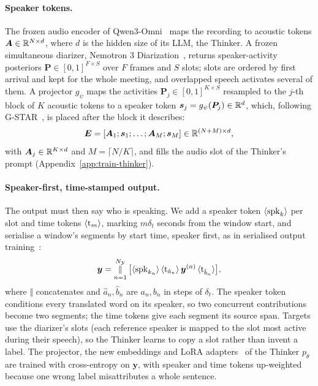 \paragraph{Speaker tokens.} The frozen audio encoder of Qwen3-Omni~\citep{xu2025qwen3omni} maps the recording to
acoustic tokens $\bm{A}\in\mathbb{R}^{N\times d}$, where $d$ is the hidden size of its LLM, the Thinker. A frozen simultaneous
diarizer, Nemotron 3 Diarization~\citep{medennikov2026nemotron}, returns speaker-activity posteriors
$\bm{P}\in[0,1]^{F\times S}$ over $F$ frames and $S$ slots; slots are ordered by first arrival and kept for the whole
meeting, and overlapped speech activates several of them. A projector $g_\psi$ maps the activities
$\bm{P}_j\in[0,1]^{K\times S}$ resampled to the $j$-th block of $K$ acoustic tokens to a speaker token
$\bm{s}_j=g_\psi(\bm{P}_j)\in\mathbb{R}^{d}$, which, following G-STAR~\citep{peng2026gstar}, is placed after the block it describes:
\begin{equation}
\bm{E}=[\bm{A}_1;\bm{s}_1;\dots;\bm{A}_M;\bm{s}_M]\in\mathbb{R}^{(N+M)\times d},
\label{eq:interleave}
\end{equation}
with $\bm{A}_j\in\mathbb{R}^{K\times d}$ and $M=\lceil N/K\rceil$, and fills the audio slot of the Thinker's prompt
(Appendix~\ref{app:train-thinker}).

\paragraph{Speaker-first, time-stamped output.} The output must then say who is speaking. We add a speaker token
$\langle\mathrm{spk}_{k}\rangle$ per slot and time tokens $\langle\mathrm{t}_{m}\rangle$, marking $m\delta_t$ seconds from the window start, and serialise a
window's segments by start time, speaker first, as in serialised output training~\citep{kanda2020sot}:
\begin{equation}
\bm{y}=\mathop{\Vert}_{n=1}^{N_\mathcal{Y}}\big[\langle\mathrm{spk}_{k_n}\rangle\,\langle\mathrm{t}_{\hat a_n}\rangle\,\bm{y}^{(n)}\,\langle\mathrm{t}_{\hat b_n}\rangle\big],
\label{eq:serial}
\end{equation}
where $\Vert$ concatenates and $\hat a_n,\hat b_n$ are $a_n,b_n$ in steps of $\delta_t$. The speaker token conditions
every translated word on its speaker, so two concurrent contributions become two segments; the time tokens give each
segment its source span. Targets use the diarizer's slots (each reference speaker is mapped to the slot most active
during their speech), so the Thinker learns to copy a slot rather than invent a label. The projector, the new
embeddings and LoRA adapters~\citep{hu2022lora} of the Thinker $p_\theta$ are trained with cross-entropy on $\bm{y}$,
with speaker and time tokens up-weighted because one wrong label misattributes a whole sentence.

